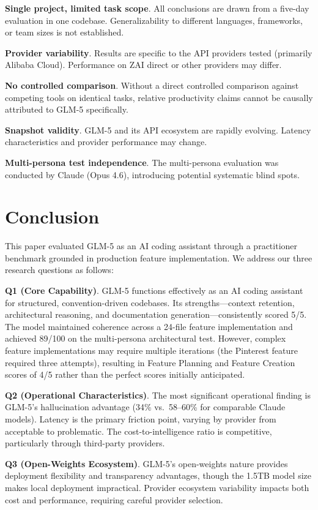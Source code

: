 \documentclass[conference]{IEEEtran}
\begin{document}
\textbf{Single project, limited task scope}. All conclusions are drawn from a five-day evaluation in one codebase. Generalizability to different languages, frameworks, or team sizes is not established.

\textbf{Provider variability}. Results are specific to the API providers tested (primarily Alibaba Cloud). Performance on ZAI direct or other providers may differ.

\textbf{No controlled comparison}. Without a direct controlled comparison against competing tools on identical tasks, relative productivity claims cannot be causally attributed to GLM-5 specifically.

\textbf{Snapshot validity}. GLM-5 and its API ecosystem are rapidly evolving. Latency characteristics and provider performance may change.

\textbf{Multi-persona test independence}. The multi-persona evaluation was conducted by Claude (Opus 4.6), introducing potential systematic blind spots.

\section{Conclusion}
This paper evaluated GLM-5 as an AI coding assistant through a practitioner benchmark grounded in production feature implementation. We address our three research questions as follows:

\textbf{Q1 (Core Capability)}. GLM-5 functions effectively as an AI coding assistant for structured, convention-driven codebases. Its strengths---context retention, architectural reasoning, and documentation generation---consistently scored 5/5. The model maintained coherence across a 24-file feature implementation and achieved 89/100 on the multi-persona architectural test. However, complex feature implementations may require multiple iterations (the Pinterest feature required three attempts), resulting in Feature Planning and Feature Creation scores of 4/5 rather than the perfect scores initially anticipated.

\textbf{Q2 (Operational Characteristics)}. The most significant operational finding is GLM-5's hallucination advantage (34\% vs.\ 58--60\% for comparable Claude models). Latency is the primary friction point, varying by provider from acceptable to problematic. The cost-to-intelligence ratio is competitive, particularly through third-party providers.

\textbf{Q3 (Open-Weights Ecosystem)}. GLM-5's open-weights nature provides deployment flexibility and transparency advantages, though the 1.5TB model size makes local deployment impractical. Provider ecosystem variability impacts both cost and performance, requiring careful provider selection.
\end{document}
